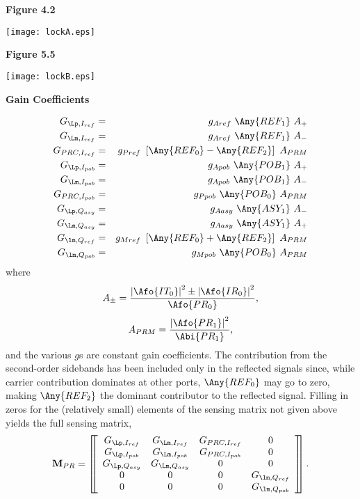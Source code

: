 \documentclass[12pt]{article}
\newcommand{\tit}[1]{\begin{center}\textbf{\Huge{#1}}\end{center}\vspace{1ex}}
\newcommand{\fig}[1]{\textbf{\large{Figure #1}}}
\begin{document}
\newpage
\tit{\LA}

\fig{4.2}

\begin{center}
\texttt{[image: lockA.eps]}
\end{center}

\vspace{0.5in}

\fig{5.5}

\begin{center}
\texttt{[image: lockB.eps]}
\end{center}

\newpage
\tit{Gain Coefficients}

\begin{eqnarray}
 G_{\Lp, I_{ref}} & = & g_{Aref}~ \Any{REF_1}~ A_{+}  \\
 G_{\Lm, I_{ref}} & = & g_{Aref}~ \Any{REF_1}~ A_{-} \\
 G_{\lp, I_{ref}}  & = & g_{Pref}~ \group{\Any{REF_0} - \Any{REF_2}}~
  A_{PRM} \\
 G_{\Lp, I_{pob}} & = & g_{Apob}~ \Any{POB_1}~ A_{+} \\
 G_{\Lm, I_{pob}} & = & g_{Apob}~ \Any{POB_1}~ A_{-} \\
 G_{\lp, I_{pob}}  & = & g_{Ppob}~ \Any{POB_0}~ A_{PRM} \\
 G_{\Lp, Q_{asy}} & = & g_{Aasy}~ \Any{ASY_1}~ A_{-} \\
 G_{\Lm, Q_{asy}} & = & g_{Aasy}~ \Any{ASY_1}~ A_{+} \\
 G_{\lm, Q_{ref}} & = & g_{Mref}~ \group{\Any{REF_0} + \Any{REF_2}}~
  A_{PRM} \\
 G_{\lm, Q_{pob}} & = & g_{Mpob}~ \Any{POB_0}~ A_{PRM}
\end{eqnarray}
 where
\begin{equation}
\elabel{A_pm}
A_{\pm} = \frac{\abs{\Afo{IT_0}}^2 \pm \abs{\Afo{IR_0}}^2}{\Afo{PR_0}},
\end{equation}
%
\begin{equation}
\elabel{A_PRM}
A_{PRM} = \frac{\abs{\Afo{PR_1}}^2}{\Abi{PR_1}},
\end{equation}
%
 and the various $g$s are constant gain coefficients.
The contribution from the second-order sidebands has been
 included only in the reflected signals since,
 while carrier contribution dominates at other ports,
 $\Any{REF_0}$ may go to zero,
 making $\Any{REF_2}$ the dominant contributor to the reflected signal.
Filling in zeros for the (relatively small)
 elements of the sensing matrix not given above
 yields the full sensing matrix,
\begin{equation}
\elabel{SM_PRIFO}
\SM_{PR} =
\matrixBegin{cccc}
 G_{\Lp, I_{ref}} & G_{\Lm, I_{ref}} & G_{\lp, I_{ref}} & 0 \\
 G_{\Lp, I_{pob}} & G_{\Lm, I_{pob}} & G_{\lp, I_{pob}} & 0 \\
 G_{\Lp, Q_{asy}} & G_{\Lm, Q_{asy}} & 0 & 0 \\
 0 & 0 & 0 & G_{\lm, Q_{ref}} \\
 0 & 0 & 0 & G_{\lm, Q_{pob}}
\matrixEnd.
\end{equation}
\end{document}
